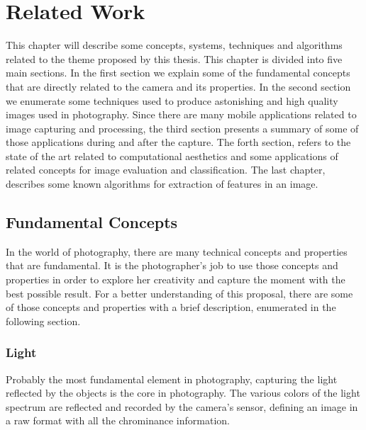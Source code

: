 \chapter{Related Work}
\label{cha:related_work}

This chapter will describe some concepts, systems, techniques and algorithms related to the theme proposed by this thesis.
This chapter is divided into five main sections. In the first section we explain some of the fundamental concepts that are directly related to the camera and its properties. In the second section we enumerate some techniques used to produce astonishing and high quality images used in photography. Since there are many mobile applications related to image capturing and processing, the third section presents a summary of some of those applications during and after the capture. The forth section, refers to the state of the art related to computational aesthetics and some applications of related concepts for image evaluation and classification. The last chapter, describes some known algorithms for extraction of features in an image.

\section{Fundamental Concepts}
\label{sec:concepts}
In the world of photography, there are many technical concepts and properties that are fundamental. It is the photographer's job to use those concepts and properties in order to explore her creativity and capture the moment with the best possible result.
For a better understanding of this proposal, there are some of those concepts and properties with a brief description, enumerated in the following section.

\subsection{Light}
\label{sub:light}
Probably the most fundamental element in photography, capturing the light reflected by the objects is the core in photography. The various colors of the light spectrum are reflected and recorded by the camera's sensor, defining an image in a raw format with all the chrominance information.

